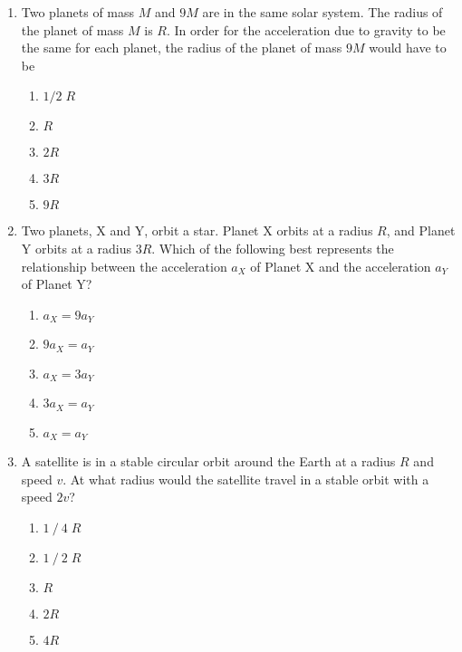 \documentclass{../../oss-apphys}
\begin{document}
\begin{multicols}{2}
\begin{enumerate}[leftmargin=18pt,start=8]
  \item Two planets of mass $M$ and $9M$ are in the same solar system. The
    radius of the planet of mass $M$ is $R$. In order for the acceleration due
    to gravity to be the same for each planet, the radius of the planet of mass
    $9M$ would have to be
    \begin{enumerate}[noitemsep,topsep=0pt,leftmargin=18pt]
    \item $1/2\;R$
    \item $R$
    \item $2R$
    \item $3R$
    \item $9R$
    \end{enumerate}
    \vspace{-0.5in}
  \item Two planets, X and Y, orbit a star. Planet X orbits at a radius $R$, and
    Planet Y orbits at a radius $3R$. Which of the following best represents
    the relationship between the acceleration $a_X$ of Planet X and the
    acceleration $a_Y$ of Planet Y?
    \begin{center}
    \end{center}
    \begin{enumerate}[noitemsep,topsep=0pt,leftmargin=18pt]  
    \item $a_X = 9a_Y$
    \item $9a_X = a_Y$
    \item $a_X = 3a_Y$
    \item $3a_X = a_Y$
    \item $a_X = a_Y$
    \end{enumerate}
  \item A satellite is in a stable circular orbit around the Earth at a radius
    $R$ and speed $v$. At what radius would the satellite travel in a stable
    orbit with a speed $2v$?
    \begin{enumerate}[noitemsep,topsep=0pt,leftmargin=18pt]  
    \item $1⁄4\;R$
    \item $1⁄2\;R$
    \item $R$
    \item $2R$
    \item $4R$
    \end{enumerate}


\end{enumerate}
\end{multicols}
\end{document}
